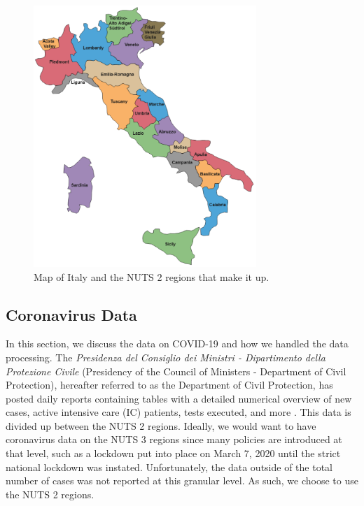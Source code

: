 \documentclass[12pt]{article}
\begin{document}
	\begin{figure}[H]
	    \centering
	    \includegraphics[width=0.75\textwidth]{output/Italy-Map.pdf}
	    \caption{Map of Italy and the NUTS 2 regions that make it up.}
	    \label{fig:map_italy}
	\end{figure}
	
	\subsection{Coronavirus Data} \label{subsec:coronavirus_data}
	In this section, we discuss the data on COVID-19 and how we handled the data processing. The \textit{Presidenza del Consiglio dei Ministri - Dipartimento della Protezione Civile} (Presidency of the Council of Ministers - Department of Civil Protection), hereafter referred to as the Department of Civil Protection, has posted daily reports containing tables with a detailed numerical overview of new cases, active intensive care (IC) patients, tests executed, and more \parencite{Rosini2020Github}. This data is divided up between the NUTS 2 regions. Ideally, we would want to have coronavirus data on the NUTS 3 regions since many policies are introduced at that level, such as a lockdown put into place on March 7, 2020 until the strict national lockdown was instated. Unfortunately, the data outside of the total number of cases was not reported at this granular level. As such, we choose to use the NUTS 2 regions. \\
	
\end{document}
